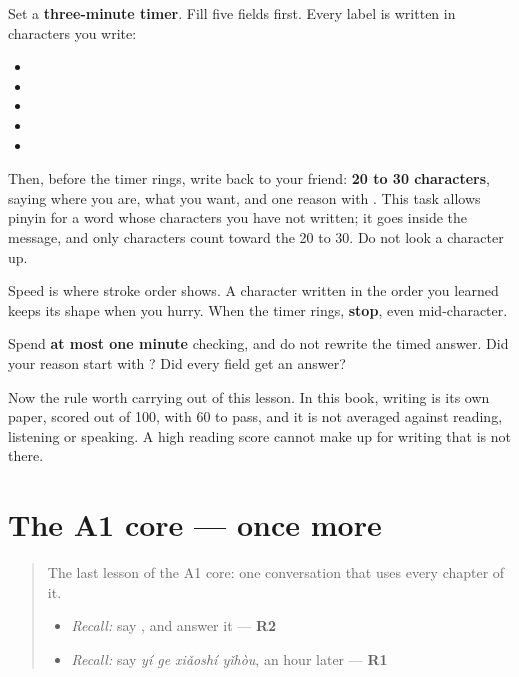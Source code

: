 Set a \textbf{three-minute timer}. Fill five fields first. Every label is written in characters you write:

\begin{itemize}
\raggedright
  \item {}
  \item {}
  \item {}
  \item {}
  \item {}
\end{itemize}

Then, before the timer rings, write back to your friend: \textbf{20 to 30 characters}, saying where you are, what you want, and one reason with . This task allows pinyin for a word whose characters you have not written; it goes inside the message, and only characters count toward the 20 to 30. Do not look a character up.

Speed is where stroke order shows. A character written in the order you learned keeps its shape when you hurry. When the timer rings, \textbf{stop}, even mid-character.

\begin{tcolorbox}[breakable,colback=teal!4,colframe=teal!35!black,title={Before you move on}]
Spend \textbf{at most one minute} checking, and do not rewrite the timed answer. Did your reason start with ? Did every field get an answer?

Now the rule worth carrying out of this lesson. In this book, writing is its own paper, scored out of 100, with 60 to pass, and it is not averaged against reading, listening or speaking. A high reading score cannot make up for writing that is not there.
\end{tcolorbox}
\section[(dialogue)]{The A1 core — once more}

\label{lesson:ZH-R98-review-final-98}



\begin{quote}
The last lesson of the A1 core: one conversation that uses every chapter of it.

\begin{itemize}
\raggedright
  \item \emph{Recall:} say , and answer it — \textbf{R2}
  \item \emph{Recall:} say \emph{yí ge xiǎoshí yǐhòu}, an hour later — \textbf{R1}
\end{itemize}
\end{quote}

